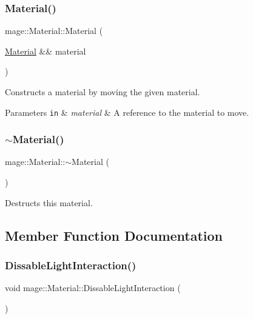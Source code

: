 \subsubsection{\texorpdfstring{Material()}{Material()}\hspace{0.1cm}{\footnotesize\ttfamily [3/3]}}
{\footnotesize\ttfamily mage\+::\+Material\+::\+Material (\begin{DoxyParamCaption}\item[{\hyperlink{structmage_1_1_material}{Material} \&\&}]{material }\end{DoxyParamCaption})\hspace{0.3cm}{\ttfamily [default]}}

Constructs a material by moving the given material.


\begin{DoxyParams}[1]{Parameters}
\mbox{\tt in}  & {\em material} & A reference to the material to move. \\
\hline
\end{DoxyParams}
\hypertarget{structmage_1_1_material_a4ca65b7e24144ee08dd1ce8d0eda9284}{}\label{structmage_1_1_material_a4ca65b7e24144ee08dd1ce8d0eda9284} 
\subsubsection{\texorpdfstring{$\sim$\+Material()}{~Material()}}
{\footnotesize\ttfamily mage\+::\+Material\+::$\sim$\+Material (\begin{DoxyParamCaption}{ }\end{DoxyParamCaption})\hspace{0.3cm}{\ttfamily [default]}}

Destructs this material. 

\subsection{Member Function Documentation}
\hypertarget{structmage_1_1_material_ab4b92a53ee74e401c518eea299fb4e0b}{}\label{structmage_1_1_material_ab4b92a53ee74e401c518eea299fb4e0b} 
\subsubsection{\texorpdfstring{Dissable\+Light\+Interaction()}{DissableLightInteraction()}}
{\footnotesize\ttfamily void mage\+::\+Material\+::\+Dissable\+Light\+Interaction (\begin{DoxyParamCaption}{ }\end{DoxyParamCaption})\hspace{0.3cm}{\ttfamily [noexcept]}}

